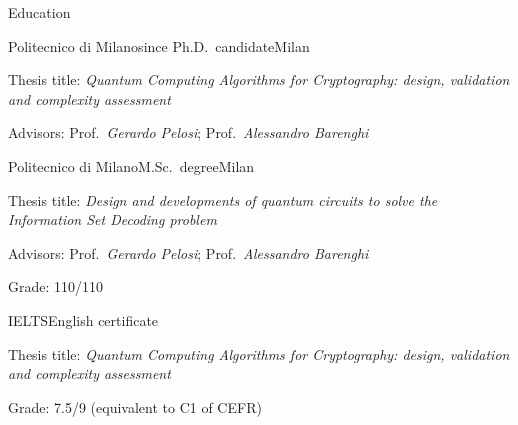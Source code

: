\documentclass[
	a4paper, %
	11pt, %
]{tresume} %
\begin{document}
\begin{tSection}{Education}
  \begin{tSubsection}{Politecnico di Milano}{since }{Ph.D.\ candidate}{Milan}
  \item Thesis title: \emph{Quantum Computing Algorithms for Cryptography: design, validation and complexity assessment}
  \item Advisors: Prof.\ \emph{Gerardo Pelosi}; Prof.\ \emph{Alessandro Barenghi}
  \end{tSubsection}
  \begin{tSubsection}{Politecnico di Milano}{}{M.Sc.\ degree}{Milan}
  \item Thesis title: \emph{Design and developments of quantum circuits to solve the Information Set Decoding problem}
  \item Advisors: Prof.\ \emph{Gerardo Pelosi}; Prof.\ \emph{Alessandro
      Barenghi}
  \item Grade: 110/110
  \end{tSubsection}
  \begin{tSubsection}{IELTS}{}{English certificate}{}
  \item Thesis title: \textit{Quantum Computing Algorithms for Cryptography: design, validation and complexity assessment}
  \item Grade: 7.5/9 (equivalent to C1 of CEFR)
  \end{tSubsection}
\end{tSection}
\end{document}
